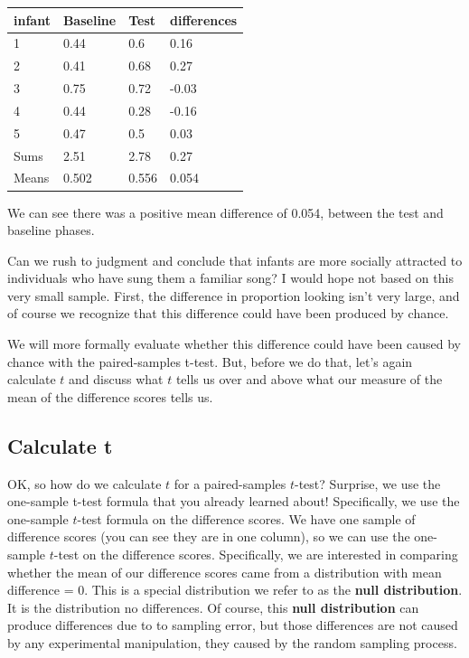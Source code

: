 \documentclass[
]{book}
\begin{document}
\begin{tabular}{l|l|l|l}
\hline
infant & Baseline & Test & differences\\
\hline
1 & 0.44 & 0.6 & 0.16\\
\hline
2 & 0.41 & 0.68 & 0.27\\
\hline
3 & 0.75 & 0.72 & -0.03\\
\hline
4 & 0.44 & 0.28 & -0.16\\
\hline
5 & 0.47 & 0.5 & 0.03\\
\hline
Sums & 2.51 & 2.78 & 0.27\\
\hline
Means & 0.502 & 0.556 & 0.054\\
\hline
\end{tabular}

We can see there was a positive mean difference of 0.054, between the test and baseline phases.

Can we rush to judgment and conclude that infants are more socially attracted to individuals who have sung them a familiar song? I would hope not based on this very small sample. First, the difference in proportion looking isn't very large, and of course we recognize that this difference could have been produced by chance.

We will more formally evaluate whether this difference could have been caused by chance with the paired-samples t-test. But, before we do that, let's again calculate \(t\) and discuss what \(t\) tells us over and above what our measure of the mean of the difference scores tells us.

\subsection{Calculate t}\label{calculate-t}

OK, so how do we calculate \(t\) for a paired-samples \(t\)-test? Surprise, we use the one-sample t-test formula that you already learned about! Specifically, we use the one-sample \(t\)-test formula on the difference scores. We have one sample of difference scores (you can see they are in one column), so we can use the one-sample \(t\)-test on the difference scores. Specifically, we are interested in comparing whether the mean of our difference scores came from a distribution with mean difference = 0. This is a special distribution we refer to as the \textbf{null distribution}. It is the distribution no differences. Of course, this \textbf{null distribution} can produce differences due to to sampling error, but those differences are not caused by any experimental manipulation, they caused by the random sampling process.
\end{document}
